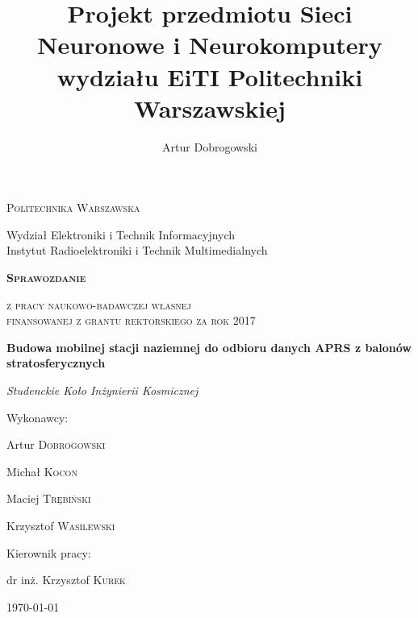 \documentclass[a4paper,12pt]{article}
\title{Projekt przedmiotu Sieci Neuronowe i Neurokomputery wydziału EiTI Politechniki Warszawskiej}
\author{Artur Dobrogowski}
\begin{document}
%
\begin{titlepage}
    \centering
    {\scshape\Large {\radikalwut Politechnika Warszawska}\\\par Wydział Elektroniki i Technik Informacyjnych\\Instytut Radioelektroniki i Technik Multimedialnych \par}
    \vspace{1cm}
    {\huge\scshape\bfseries Sprawozdanie\\\par}
    {\scshape\Large z pracy naukowo-badawczej własnej\\ finansowanej z grantu rektorskiego za rok 2017\\\par}
    \vspace{1cm}
    {\Large\bfseries Budowa mobilnej stacji naziemnej do odbioru danych APRS z balonów stratosferycznych\\\par}
    \vspace{1cm}
    {\Large\textsl {Studenckie Koło Inżynierii Kosmicznej}\par}
    \vfill
    Wykonawcy: \par
    {\small
    \begin{multicols}{2}

    \par Artur \textsc{Dobrogowski} 
    \par Michał \textsc{Kocon}
    \par Maciej \textsc{Trębiński}
    \par Krzysztof \textsc{Wasilewski}
    \end{multicols}
}
    Kierownik pracy:\par
    dr inż. Krzysztof \textsc{Kurek}

    \vfill

    {\large \today\par}
\end{titlepage}

\tableofcontents











% 



\label{ENDOFDOC}
\end{document}
